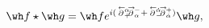 \begin{equation}
\wh f \star \wh g = 
\wh f e^{i(\stackrel{\, _\leftarrow}{\partial}{\!}_+^\alpha 
\!\!\! \stackrel{\, _\rightarrow}{\partial}{\!}^-_\alpha
+ \stackrel{\, _\leftarrow}{\partial}{\!}_-^{\dot\alpha} 
\!\!\! \stackrel{\, _\rightarrow}{\partial}{\!}^+_{\dot\alpha})} 
\wh g, \label{eq:hfstarhg}
\end{equation}

